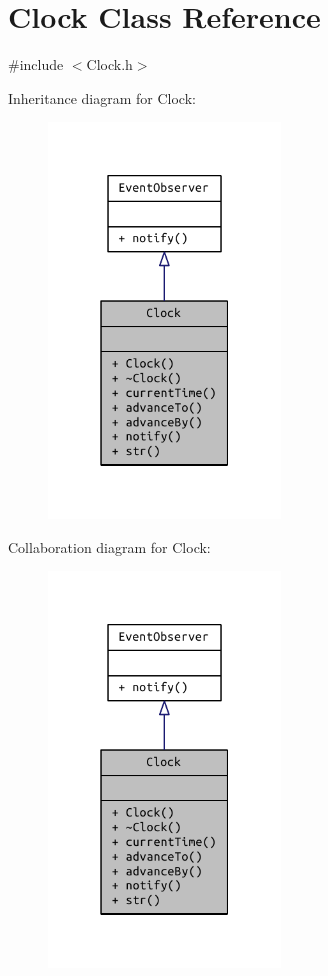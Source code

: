 \hypertarget{class_clock}{}\section{Clock Class Reference}
\label{class_clock}


{\ttfamily \#include $<$Clock.\+h$>$}



Inheritance diagram for Clock\+:
\nopagebreak
\begin{figure}[H]
\begin{center}
\leavevmode
\includegraphics[width=175pt]{class_clock__inherit__graph}
\end{center}
\end{figure}


Collaboration diagram for Clock\+:
\nopagebreak
\begin{figure}[H]
\begin{center}
\leavevmode
\includegraphics[width=175pt]{class_clock__coll__graph}
\end{center}
\end{figure}
